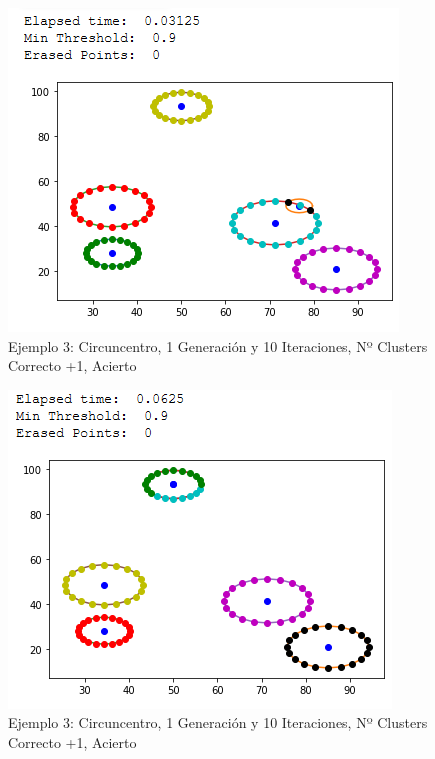 \documentclass[conference,a4paper]{IEEEtran}
\begin{document}
\begin{figure}[H]
\centering
\includegraphics[scale=0.65]{Experimentacion/Ejemplo3/ej3_c_1_10_mc_correct}
\caption{Ejemplo 3: Circuncentro, 1 Generación y 10 Iteraciones,  Nº Clusters Correcto +1, Acierto\\}
\end{figure}

\begin{figure}[H]
\centering
\includegraphics[scale=0.65]{Experimentacion/Ejemplo3/ej3_c_1_10_mc_correct2}
\caption{Ejemplo 3: Circuncentro, 1 Generación y 10 Iteraciones,  Nº Clusters Correcto +1, Acierto\\}
\end{figure}
\end{document}
